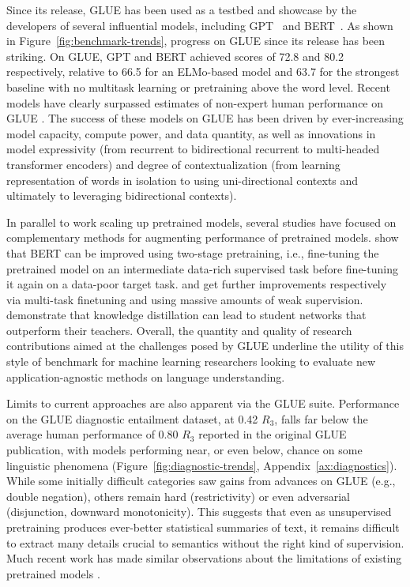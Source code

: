 Since its release, GLUE has been used as a testbed and showcase by the developers of several influential models, including GPT~\citep{radford2018improving} and BERT~\citep{devlin2018bert}. As shown in Figure~\ref{fig:benchmark-trends}, progress on GLUE since its release has been striking.
On GLUE, GPT and BERT achieved scores of 72.8 and 80.2 respectively, relative to 66.5 for an ELMo-based model \citep{peters2018deep} and 63.7 for the strongest baseline with no multitask learning or pretraining above the word level. 
Recent models \citep{liu2019mt,yang2019xlnet} have clearly surpassed estimates of non-expert human performance on GLUE \citep{nangia2019human}. 
The success of these models on GLUE has been driven by ever-increasing model capacity, compute power, and data quantity, as well as innovations in model expressivity (from recurrent to bidirectional recurrent to multi-headed transformer encoders) and degree of contextualization (from learning representation of words in isolation to using uni-directional contexts and ultimately to leveraging bidirectional contexts).

In parallel to work scaling up pretrained models, several studies have focused on complementary methods for augmenting performance of pretrained models. \citet{phang2018sentence} show that BERT can be improved using two-stage pretraining, i.e., fine-tuning the pretrained model on an intermediate data-rich supervised task before fine-tuning it again on a data-poor target task.
\citet{liu2019mt, liu2019improving} and \citet{snorkel:2018} get further improvements respectively via multi-task finetuning and using massive amounts of weak supervision.
\citet{clark2019bam} demonstrate that knowledge distillation \citep{hinton2015distilling,furlanello2018born} can lead to student networks that outperform their teachers.
Overall, the quantity and quality of research contributions aimed at the challenges posed by GLUE underline the utility of this style of benchmark for machine learning researchers looking to evaluate new application-agnostic methods on language understanding.

Limits to current approaches are also apparent via the GLUE suite. 
Performance on the GLUE diagnostic entailment dataset, at 0.42 $R_3$, falls far below the average human performance of 0.80 $R_3$ reported in the original GLUE publication, with models performing near, or even below, chance on some linguistic phenomena (Figure~\ref{fig:diagnostic-trends}, Appendix~\ref{ax:diagnostics}). While some initially difficult categories saw gains from advances on GLUE (e.g., double negation), others remain hard (restrictivity) or even adversarial (disjunction, downward monotonicity). This suggests that even as unsupervised pretraining produces ever-better statistical summaries of text, it remains difficult to extract many details crucial to semantics without the right kind of supervision. 
Much recent work has made similar observations about the limitations of existing pretrained models
\citep{jia2017adversarial, naik2018stresstest, mccoy2019nonentailed, mccoy2019wrongreasons,  liu2019transferability, liu2019inoculation}.
 

